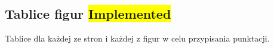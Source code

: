 \subsection{Tablice figur \colorbox{yellow}{Implemented}}
\label{subsec:tablice-figur}

{
    \color{red}
    \large Tablice dla każdej ze stron i każdej z figur w celu przypisania punktacji.
}